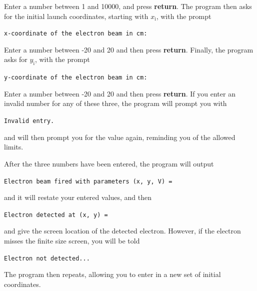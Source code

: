 Enter a number between 1 and 10000, and press \textbf{return}. The program then
asks for the initial launch coordinates, starting with $x_\mathrm{i}$, with the
prompt

\texttt{x-coordinate of the electron beam in cm:}

Enter a number between -20 and 20 and then press \textbf{return}. Finally, the
program asks for $y_\mathrm{i}$, with the prompt

\texttt{y-coordinate of the electron beam in cm:}

Enter a number between -20 and 20 and then press \textbf{return}. If you enter
an invalid number for any of these three, the program will prompt you with

\texttt{Invalid entry.}

and will then prompt you for the value again, reminding you of the allowed
limits.

After the three numbers have been entered, the program will output

\texttt{Electron beam fired with parameters (x, y, V) =}

and it will restate your entered values, and then

\texttt{Electron detected at (x, y) =}

and give the screen location of the detected electron. However, if the electron
misses the finite size screen, you will be told

\texttt{Electron not detected...}

The program then repeats, allowing you to enter in a new set of initial
coordinates.
